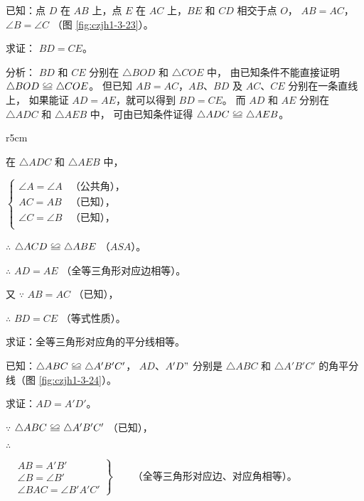 \liti  已知：点 $D$ 在 $AB$ 上，点 $E$ 在 $AC$ 上，$BE$ 和 $CD$ 相交于点 $O$，
$AB = AC$， $\angle B= \angle C$ （图 \ref{fig:czjh1-3-23}）。

求证： $BD = CE$。

分析： $BD$ 和 $CE$ 分别在 $\triangle BOD$ 和 $\triangle COE$ 中，
由已知条件不能直接证明 $\triangle BOD \quandeng \triangle COE$。
但已知 $AB = AC$，$AB$、$BD$ 及 $AC$、$CE$ 分别在一条直线上，
如果能证 $AD = AE$，就可以得到 $BD = CE$。
而 $AD$ 和 $AE$ 分别在 $\triangle ADC$ 和 $\triangle AEB$ 中，
可由已知条件证得 $\triangle ADC \quandeng \triangle AEB$。

\begin{wrapfigure}[7]{r}{5cm}
    \centering
    
    \caption{}\label{fig:czjh1-3-23}
\end{wrapfigure}

\zhengming 在 $\triangle ADC$ 和 $\triangle AEB$ 中，

\hspace{2em}$\begin{cases}
    \angle A = \angle A &\text{（公共角），} \\
    AC = AB & \text{（已知），} \\
    \angle C = \angle B & \text{（已知），} \\
\end{cases}$

$\therefore$ \quad  $\triangle ACD \quandeng \triangle ABE$ （$ASA$）。

$\therefore$ \quad $AD = AE$ （全等三角形对应边相等）。

又 $\because$ \quad $AB = AC$ （已知），

$\therefore$ \quad $BD = CE$ （等式性质）。


\liti 求证：全等三角形对应角的平分线相等。

已知：$\triangle ABC \quandeng \triangle A'B'C'$， $AD$、$A'D"$ 分别是
$\triangle ABC$ 和 $\triangle A'B'C'$ 的角平分线（图 \ref{fig:czjh1-3-24}）。

求证：$AD = A'D'$。

\zhengming $\because$ \quad $\triangle ABC \quandeng \triangle A'B'C'$ （已知），

\begin{minipage}[b]{2em}$\therefore$ \\ \phantom{a} \end{minipage} %
$\left.\begin{aligned}
    & AB = A'B' \\
    & \angle B = \angle B' \\
    & \angle BAC = \angle B'A'C'
\end{aligned} \right\} \qquad \text{（全等三角形对应边、对应角相等）。}$

